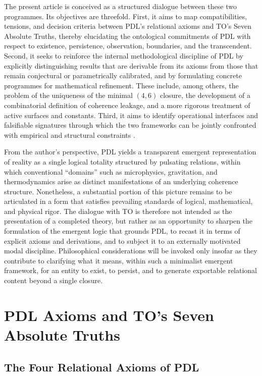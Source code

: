 \documentclass[11pt,a4paper]{article}
\begin{document}
The present article is conceived as a structured dialogue between these two programmes. Its objectives are threefold. First, it aims to map compatibilities, tensions, and decision criteria between PDL’s relational axioms and TO’s Seven Absolute Truths, thereby elucidating the ontological commitments of PDL with respect to existence, persistence, observation, boundaries, and the transcendent. Second, it seeks to reinforce the internal methodological discipline of PDL by explicitly distinguishing results that are derivable from its axioms from those that remain conjectural or parametrically calibrated, and by formulating concrete programmes for mathematical refinement. These include, among others, the problem of the uniqueness of the minimal $(4,6)$ closure, the development of a combinatorial definition of coherence leakage, and a more rigorous treatment of active surfaces and constants. Third, it aims to identify operational interfaces and falsifiable signatures through which the two frameworks can be jointly confronted with empirical and structural constraints \cite{TO_community_about}.  

From the author’s perspective, PDL yields a transparent emergent representation of reality as a single logical totality structured by pulsating relations, within which conventional “domains” such as microphysics, gravitation, and thermodynamics arise as distinct manifestations of an underlying coherence structure. Nonetheless, a substantial portion of this picture remains to be articulated in a form that satisfies prevailing standards of logical, mathematical, and physical rigor. The dialogue with TO is therefore not intended as the presentation of a completed theory, but rather as an opportunity to sharpen the formulation of the emergent logic that grounds PDL, to recast it in terms of explicit axioms and derivations, and to subject it to an externally motivated modal discipline. Philosophical considerations will be invoked only insofar as they contribute to clarifying what it means, within such a minimalist emergent framework, for an entity to exist, to persist, and to generate exportable relational content beyond a single closure.

\section{PDL Axioms and TO's Seven Absolute Truths}

\subsection{The Four Relational Axioms of PDL}
\end{document}
